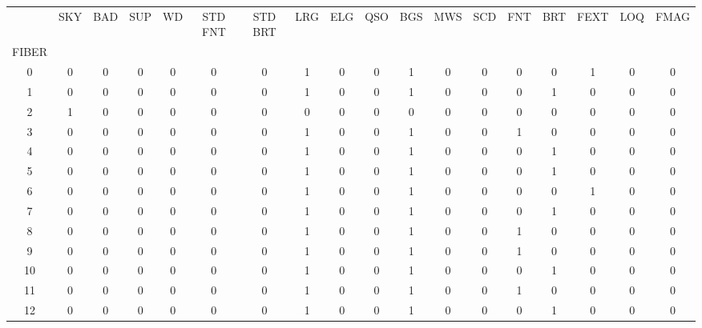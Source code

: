 \begin{tabular}{|c|c|c|c|c|c|c|c|c|c|c|c|c|c|c|c|c|c|}
\toprule
{} &  SKY &  BAD &  SUP &  WD &  STD FNT &  STD BRT &  LRG &  ELG &  QSO &  BGS &  MWS &  SCD &  FNT &  BRT &  FEXT &  LOQ &  FMAG \\
FIBER &      &      &      &     &          &          &      &      &      &      &      &      &      &      &       &      &       \\
\midrule
0     &    0 &    0 &    0 &   0 &        0 &        0 &    1 &    0 &    0 &    1 &    0 &    0 &    0 &    0 &     1 &    0 &     0 \\
1     &    0 &    0 &    0 &   0 &        0 &        0 &    1 &    0 &    0 &    1 &    0 &    0 &    0 &    1 &     0 &    0 &     0 \\
2     &    1 &    0 &    0 &   0 &        0 &        0 &    0 &    0 &    0 &    0 &    0 &    0 &    0 &    0 &     0 &    0 &     0 \\
3     &    0 &    0 &    0 &   0 &        0 &        0 &    1 &    0 &    0 &    1 &    0 &    0 &    1 &    0 &     0 &    0 &     0 \\
4     &    0 &    0 &    0 &   0 &        0 &        0 &    1 &    0 &    0 &    1 &    0 &    0 &    0 &    1 &     0 &    0 &     0 \\
5     &    0 &    0 &    0 &   0 &        0 &        0 &    1 &    0 &    0 &    1 &    0 &    0 &    0 &    1 &     0 &    0 &     0 \\
6     &    0 &    0 &    0 &   0 &        0 &        0 &    1 &    0 &    0 &    1 &    0 &    0 &    0 &    0 &     1 &    0 &     0 \\
7     &    0 &    0 &    0 &   0 &        0 &        0 &    1 &    0 &    0 &    1 &    0 &    0 &    0 &    1 &     0 &    0 &     0 \\
8     &    0 &    0 &    0 &   0 &        0 &        0 &    1 &    0 &    0 &    1 &    0 &    0 &    1 &    0 &     0 &    0 &     0 \\
9     &    0 &    0 &    0 &   0 &        0 &        0 &    1 &    0 &    0 &    1 &    0 &    0 &    1 &    0 &     0 &    0 &     0 \\
10    &    0 &    0 &    0 &   0 &        0 &        0 &    1 &    0 &    0 &    1 &    0 &    0 &    0 &    1 &     0 &    0 &     0 \\
11    &    0 &    0 &    0 &   0 &        0 &        0 &    1 &    0 &    0 &    1 &    0 &    0 &    1 &    0 &     0 &    0 &     0 \\
12    &    0 &    0 &    0 &   0 &        0 &        0 &    1 &    0 &    0 &    1 &    0 &    0 &    0 &    1 &     0 &    0 &     0 \\

\end{tabular}
